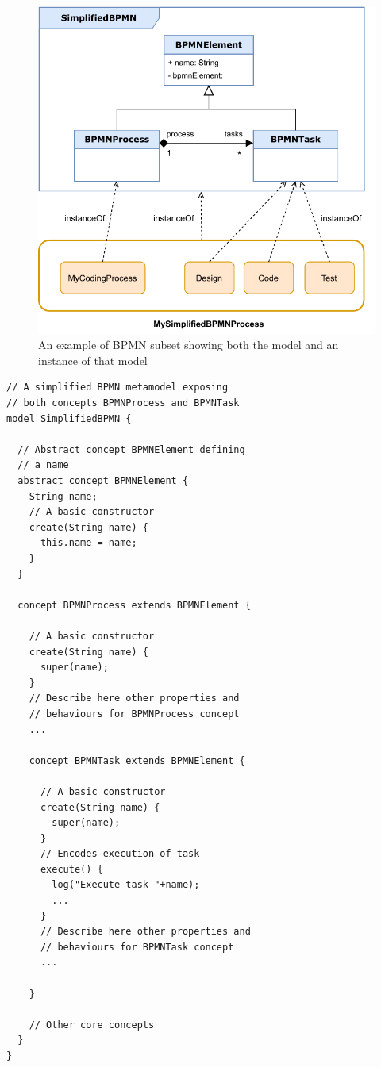 \begin{figure}[t]
    \centering
    \includegraphics[width=\columnwidth]{Figures/BPMNSubsetExample.pdf}
    \caption{An example of BPMN subset showing both the model and an instance of that model}
    \label{fig:BPMNSubsetExample}
\end{figure}

\begin{lstlisting}
// A simplified BPMN metamodel exposing
// both concepts BPMNProcess and BPMNTask
model SimplifiedBPMN {

  // Abstract concept BPMNElement defining
  // a name
  abstract concept BPMNElement {
    String name;
    // A basic constructor
    create(String name) {
      this.name = name;
    }
  }

  concept BPMNProcess extends BPMNElement {

    // A basic constructor
    create(String name) {
      super(name);
    }
    // Describe here other properties and
    // behaviours for BPMNProcess concept
    ...

    concept BPMNTask extends BPMNElement {

      // A basic constructor
      create(String name) {
        super(name);
      }
      // Encodes execution of task
      execute() {
        log("Execute task "+name);
        ...
      }
      // Describe here other properties and
      // behaviours for BPMNTask concept
      ...

    }

    // Other core concepts
  }
}
\end{lstlisting}


